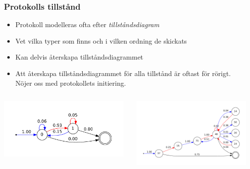 \documentclass[xetex]{beamer}
\begin{document}
    \begin{frame}
        \frametitle{Protokolls tillstånd}
        \begin{itemize}
            \item Protokoll modelleras ofta efter \emph{tillståndsdiagram}
            \item Vet vilka typer som finns och i vilken ordning de skickats
            \item Kan delvis återskapa tillståndsdiagrammet
            \item Att återskapa tillståndsdiagrammet för alla tillstånd är
                oftast för rörigt. Nöjer oss med protokollets initiering.
        \end{itemize}
        \begin{columns}[t]
            \begin{column}[T]{5cm}
                \includegraphics[height=3cm]{img/dnsstate.pdf}
            \end{column}
            \begin{column}[T]{6cm}
                \includegraphics[height=3.5cm]{img/smbstate.pdf}
            \end{column}
        \end{columns}

    \end{frame}
\end{document}
